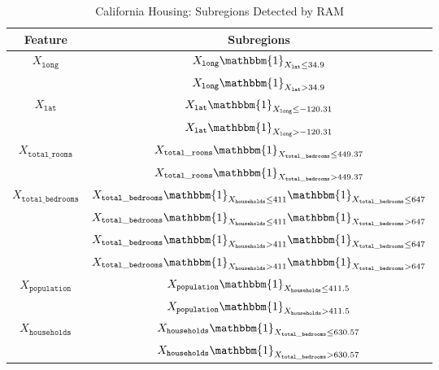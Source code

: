 \documentclass[12pt]{article}
\newcommand{\when}[1]{\mathbbm{1}_{#1}}
\begin{document}
\begin{table}[htbp]
  \centering
  \caption{California Housing: Subregions Detected by RAM}
  \label{tab:california_housing_subregions}
  \begin{tabular}{c|c}
      Feature & Subregions \\
      \hline
      \multirow{2}{*}{$X_{\mathtt{long}}$} & $X_{\mathtt{long}} \when{X_{\mathtt{lat}} \leq 34.9}$ \\
      & $X_{\mathtt{long}} \when{X_{\mathtt{lat}} > 34.9}$ \\
      \hline
      \multirow{2}{*}{$X_{\mathtt{lat}}$} & $X_{\mathtt{lat}} \when{X_{\mathtt{long}} \leq -120.31}$ \\
      & $X_{\mathtt{lat}} \when{X_{\mathtt{long}} > -120.31}$ \\
      \hline
      \multirow{2}{*}{$X_{\mathtt{total\_rooms}}$} & $X_{\mathtt{total\_rooms}} \when{X_{\mathtt{total\_bedrooms}} \leq 449.37}$ \\
        & $X_{\mathtt{total\_rooms}} \when{X_{\mathtt{total\_bedrooms}} > 449.37}$ \\
      \hline
      \multirow{4}{*}{$X_{\mathtt{total\_bedrooms}}$} & $X_{\mathtt{total\_bedrooms}} \when{X_{\mathtt{households}} \leq 411} \when{X_{\mathtt{total\_bedrooms}} \leq 647}$ \\
        & $X_{\mathtt{total\_bedrooms}} \when{X_{\mathtt{households}} \leq 411} \when{X_{\mathtt{total\_bedrooms}} > 647}$ \\
        & $X_{\mathtt{total\_bedrooms}} \when{X_{\mathtt{households}} > 411} \when{X_{\mathtt{total\_bedrooms}} \leq 647}$ \\
        & $X_{\mathtt{total\_bedrooms}} \when{X_{\mathtt{households}} > 411} \when{X_{\mathtt{total\_bedrooms}} > 647}$ \\
      \hline
      \multirow{2}{*}{$X_{\mathtt{population}}$} & $X_{\mathtt{population}} \when{X_{\mathtt{households}} \leq 411.5}$ \\
      & $X_{\mathtt{population}} \when{X_{\mathtt{households}} > 411.5}$ \\
      \hline
      \multirow{2}{*}{$X_{\mathtt{households}}$} & $X_{\mathtt{households}} \when{X_{\mathtt{total\_bedrooms}} \leq 630.57}$ \\
        & $X_{\mathtt{households}} \when{X_{\mathtt{total\_bedrooms}} > 630.57}$ \\
  \end{tabular}
\end{table}
\end{document}
